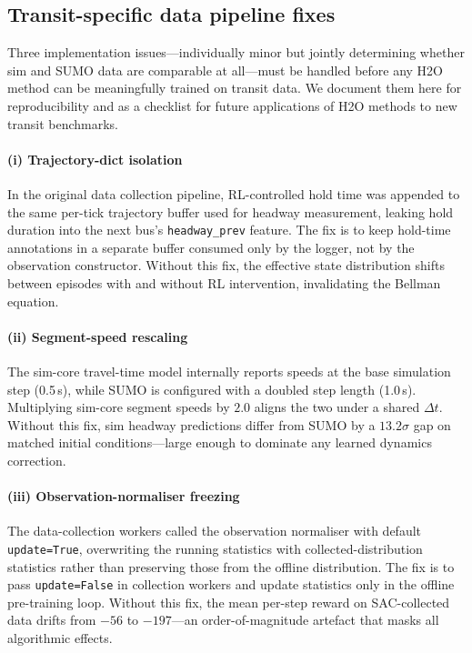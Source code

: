 \subsection{Transit-specific data pipeline fixes}
\label{app:impl:pipeline}

Three implementation issues---individually minor but jointly determining whether sim and SUMO data are comparable at all---must be handled before any H2O method can be meaningfully trained on transit data.
We document them here for reproducibility and as a checklist for future applications of H2O methods to new transit benchmarks.

\paragraph{(i) Trajectory-dict isolation}
In the original data collection pipeline, RL-controlled hold time was appended to the same per-tick trajectory buffer used for headway measurement, leaking hold duration into the next bus's \texttt{headway\_prev} feature.
The fix is to keep hold-time annotations in a separate buffer consumed only by the logger, not by the observation constructor.
Without this fix, the effective state distribution shifts between episodes with and without RL intervention, invalidating the Bellman equation.

\paragraph{(ii) Segment-speed rescaling}
The sim-core travel-time model internally reports speeds at the base simulation step (0.5\,s), while SUMO is configured with a doubled step length (1.0\,s).
Multiplying sim-core segment speeds by $2.0$ aligns the two under a shared $\Delta t$.
Without this fix, sim headway predictions differ from SUMO by a $13.2\sigma$ gap on matched initial conditions---large enough to dominate any learned dynamics correction.

\paragraph{(iii) Observation-normaliser freezing}
The data-collection workers called the observation normaliser with default \texttt{update=True}, overwriting the running statistics with collected-distribution statistics rather than preserving those from the offline distribution.
The fix is to pass \texttt{update=False} in collection workers and update statistics only in the offline pre-training loop.
Without this fix, the mean per-step reward on SAC-collected data drifts from $-56$ to $-197$---an order-of-magnitude artefact that masks all algorithmic effects.


